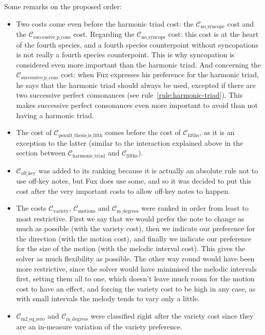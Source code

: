 Some remarks on the proposed order: 
\begin{itemize}
    \item Two costs come even before the harmonic triad cost: the $\mathcal{C}_\text{no\_syncope}$ cost and the $\mathcal{C}_\text{successive\_p\_cons}$ cost. Regarding the $\mathcal{C}_\text{no\_syncope}$ cost: this cost is at the heart of the fourth species, and a fourth species counterpoint without syncopations is not really a fourth species counterpoint. This is why syncopation is considered even more important than the harmonic triad. And concerning the $\mathcal{C}_\text{successive\_p\_cons}$ cost: when Fux expresses his preference for the harmonic triad, he says that the harmonic triad should always be used, excepted if there are two successive perfect consonances (see rule~\ref{rule:harmonic-triad}). This makes successive perfect consonances even more important to avoid than not having a harmonic triad.
    \item The cost of $\mathcal{C}_\text{penult\_thesis\_is\_fifth}$ comes before the cost of $\mathcal{C}_\text{fifths}$, as it is an exception to the latter (similar to the interaction explained above in the section between $\mathcal{C}_\text{harmonic\_triad}$ and $\mathcal{C}_\text{fifths})$.
    
    \item $\mathcal{C}_\text{off\_key}$ was added to its ranking because it is actually an absolute rule not to use off-key notes, but Fux does use some, and so it was decided to put this cost after the very important costs to allow off-key notes to happen.

    \item The costs $\mathcal{C}_\text{variety}$, $\mathcal{C}_\text{motions}$ and $\mathcal{C}_\text{m\_degrees}$ were ranked in order from least to most restrictive. First we say that we would prefer the note to change as much as possible (with the variety cost), then we indicate our preference for the direction (with the motion cost), and finally we indicate our preference for the size of the motion (with the melodic interval cost). This gives the solver as much flexibility as possible. The other way round would have been more restrictive, since the solver would have minimised the melodic intervals first, setting them all to one, which doesn't leave much room for the motion cost to have an effect, and forcing the variety cost to be high in any case, as with small intervals the melody tends to vary only a little.
    
    \item $\mathcal{C}_\text{m2\_eq\_zero}$ and $\mathcal{C}_\text{m\_degrees}$ were classified right after the variety cost since they are an in-measure variation of the variety preference.

\end{itemize}


